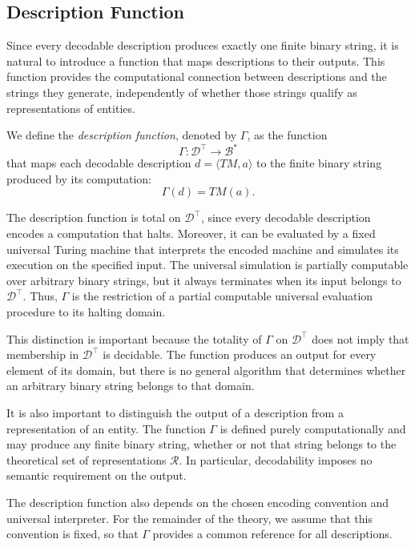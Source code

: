 \subsection*{Description Function}

Since every decodable description produces exactly one finite binary string, it is natural to introduce a function that maps descriptions to their outputs. This function provides the computational connection between descriptions and the strings they generate, independently of whether those strings qualify as representations of entities.

\begin{definition}
\label{def:description_function}
We define the \emph{description function}, denoted by $\Gamma$, as the function
\[
\Gamma:\mathcal{D}^\top\longrightarrow\mathcal{B}^\ast
\]
that maps each decodable description $d=\langle TM,a\rangle$ to the finite binary string produced by its computation:
\[
\Gamma(d)=TM(a).
\]
\end{definition}

The description function is total on $\mathcal{D}^\top$, since every decodable description encodes a computation that halts. Moreover, it can be evaluated by a fixed universal Turing machine that interprets the encoded machine and simulates its execution on the specified input. The universal simulation is partially computable over arbitrary binary strings, but it always terminates when its input belongs to $\mathcal{D}^\top$. Thus, $\Gamma$ is the restriction of a partial computable universal evaluation procedure to its halting domain.

This distinction is important because the totality of $\Gamma$ on $\mathcal{D}^\top$ does not imply that membership in $\mathcal{D}^\top$ is decidable. The function produces an output for every element of its domain, but there is no general algorithm that determines whether an arbitrary binary string belongs to that domain.

It is also important to distinguish the output of a description from a representation of an entity. The function $\Gamma$ is defined purely computationally and may produce any finite binary string, whether or not that string belongs to the theoretical set of representations $\mathcal{R}$. In particular, decodability imposes no semantic requirement on the output.

The description function also depends on the chosen encoding convention and universal interpreter. For the remainder of the theory, we assume that this convention is fixed, so that $\Gamma$ provides a common reference for all descriptions.

